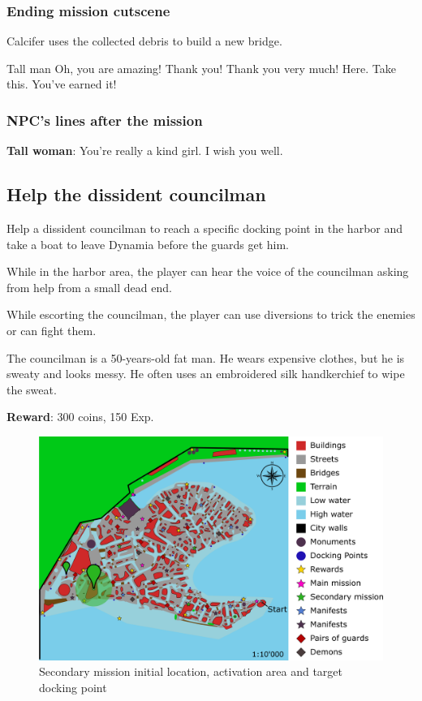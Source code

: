 \subsubsection*{Ending mission cutscene}
\begin{screenplay}

Calcifer uses the collected debris to build a new bridge.

\begin{dialogue}[excited]{Tall man}
Oh, you are amazing! Thank you! Thank you very much! Here. Take this. You've earned it!
\end{dialogue}


\end{screenplay}

\subsubsection*{NPC's lines after the mission}
\textbf{Tall woman}: You're really a kind girl. I wish you well.



\subsection{Help the dissident councilman}
Help a dissident councilman to reach a specific docking point in the harbor and take a boat to leave Dynamia before the guards get him.

While in the harbor area, the player can hear the voice of the councilman asking from help from a small dead end.

While escorting the councilman, the player can use diversions to trick the enemies or can fight them.

The councilman is a 50-years-old fat man. He wears expensive clothes, but he is sweaty and looks messy. He often uses an embroidered silk handkerchief to wipe the sweat.

\textbf{Reward}: 300 coins, 150 Exp.

\begin{figure}[H]
  \centering
  \includegraphics[width=\textwidth]{../Images/Maps/dynamiaSecondaryMissions_Councilman}
  \caption{Secondary mission initial location, activation area and target docking point}
\end{figure}


